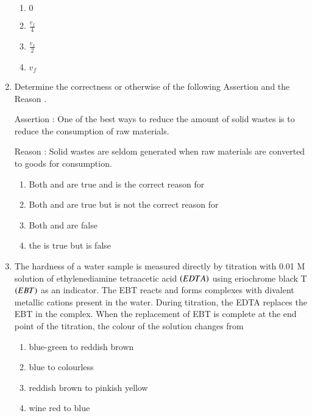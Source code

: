 \documentclass[journal,12pt,onecolumn]{article}
\theoremstyle{remark}
\begin{document}
\begin{enumerate}
\hfill{}

\begin{multicols}{2}
\begin{enumerate}
    \item $0$
    \item $\frac{v_f}{4}$
    \item $\frac{v_f}{2}$
    \item $v_f$
\end{enumerate}
\end{multicols}

\item Determine the correctness or otherwise of the following Assertion  and the Reason .

Assertion : One of the best ways to reduce the amount of solid wastes is to reduce the consumption of raw materials.

Reason : Solid wastes are seldom generated when raw materials are converted to goods for consumption.

\hfill{}

\begin{enumerate}
    \item Both  and  are true and  is the correct reason for 
    \item Both  and  are true but  is not the correct reason for 
    \item Both  and  are false
    \item the  is true but  is false
\end{enumerate}

\item The hardness of a water sample is measured directly by titration with 0.01 M solution of ethylenediamine tetraacetic acid $\left(EDTA\right)$ using eriochrome black T $\left(EBT\right)$ as an indicator. The EBT reacts and forms complexes with divalent metallic cations present in the water. During titration, the EDTA replaces the EBT in the complex. When the replacement of EBT is complete at the end point of the titration, the colour of the solution changes from

\hfill{}

\begin{enumerate}
    \item blue-green to reddish brown
    \item blue to colourless
    \item reddish brown to pinkish yellow
    \item wine red to blue
\end{enumerate}


\end{enumerate}
\end{document}
